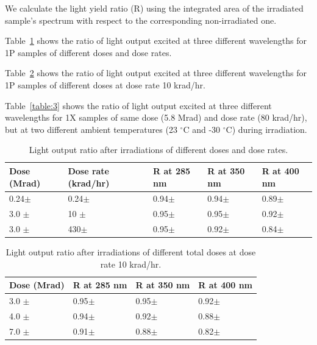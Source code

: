 \documentclass[preprint,12pt]{elsarticle}
\begin{document}
We calculate the light yield ratio (R) using the integrated area of the irradiated sample's spectrum 
with respect to the corresponding non-irradiated one. 

Table~\ref{table:1} shows the ratio of light output excited at three different wavelengths for 
1P {\color{red}{(1P1X?)}} samples of different doses and dose rates. 

Table~\ref{table:2} shows the ratio of light output excited at three different wavelengths for 
1P {\color{red}{(1P1X?)}} samples of different doses at dose rate 10 krad/hr. 

Table~\ref{table:3} shows the ratio of light output excited at three different wavelengths for 
1X {\color{red}{(1P1X?)}} samples of same dose (5.8 Mrad) and dose rate (80 krad/hr), 
but at two different ambient temperatures (23 $^\circ$C and -30 $^\circ$C) during irradiation. 

\begin{table}[!h]
\centering
  \caption{Light output ratio after irradiations of different doses and dose rates.}
  \begin{tabular}{l|l|l|l|l}
    \hline
    Dose (Mrad)  & Dose rate (krad/hr)& R at 285 nm	& R at 350 nm	& R at 400 nm    \\ \hline 
    0.24$\pm$    & 0.24$\pm$ 	      & 0.94$\pm$	& 0.94$\pm$	& 0.89$\pm$   \\ \hline
    3.0 $\pm$    & 10 $\pm$	      & 0.95$\pm$	& 0.95$\pm$	& 0.92$\pm$   \\ \hline
    3.0 $\pm$    & 430$\pm$	      & 0.95$\pm$	& 0.92$\pm$	& 0.84$\pm$   \\ 
    \hline
  \end{tabular}
  \label{table:1}
\end{table}

\begin{table}[!h]
\centering
  \caption{Light output ratio after irradiations of different total doses at dose rate 10 krad/hr.}
  \begin{tabular}{l|l|l|l}
    \hline
    Dose (Mrad)  & R at 285 nm	& R at 350 nm	& R at 400 nm    \\ \hline 
    3.0 $\pm$    & 0.95$\pm$	& 0.95$\pm$	& 0.92$\pm$   \\ \hline
    4.0 $\pm$    & 0.94$\pm$	& 0.92$\pm$	& 0.88$\pm$   \\ \hline
    7.0 $\pm$    & 0.91$\pm$	& 0.88$\pm$	& 0.82$\pm$   \\ 
    \hline
  \end{tabular}
  \label{table:2}
\end{table}
\end{document}
